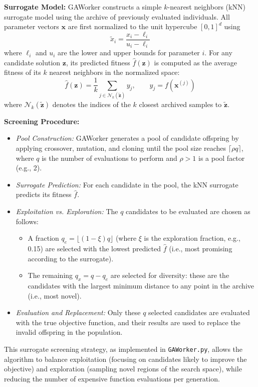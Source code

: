 \documentclass[12pt,a4paper]{article}
\begin{document}
\textbf{Surrogate Model:}  
GAWorker constructs a simple $k$-nearest neighbors (kNN) surrogate model using the archive of previously evaluated individuals. All parameter vectors $\bm{x}$ are first normalized to the unit hypercube $[0,1]^d$ using
\[
\tilde{x}_i = \frac{x_i - \ell_i}{u_i - \ell_i}
\]
where $\ell_i$ and $u_i$ are the lower and upper bounds for parameter $i$. For any candidate solution $\bm{z}$, its predicted fitness $\hat{f}(\bm{z})$ is computed as the average fitness of its $k$ nearest neighbors in the normalized space:
\[
\hat{f}(\bm{z}) = \frac{1}{k} \sum_{j \in \mathcal{N}_k(\tilde{\bm{z}})} y_j, \qquad y_j = f(\bm{x}^{(j)})
\]
where $\mathcal{N}_k(\tilde{\bm{z}})$ denotes the indices of the $k$ closest archived samples to $\tilde{\bm{z}}$.

\textbf{Screening Procedure:}
\begin{itemize}
    \item \emph{Pool Construction:} GAWorker generates a pool of candidate offspring by applying crossover, mutation, and cloning until the pool size reaches $\lceil \rho q \rceil$, where $q$ is the number of evaluations to perform and $\rho > 1$ is a pool factor (e.g., 2).
    \item \emph{Surrogate Prediction:} For each candidate in the pool, the kNN surrogate predicts its fitness $\hat{f}$.
    \item \emph{Exploitation vs. Exploration:} The $q$ candidates to be evaluated are chosen as follows:
    \begin{itemize}
        \item A fraction $q_e = \lfloor (1-\xi)q \rfloor$ (where $\xi$ is the exploration fraction, e.g., 0.15) are selected with the lowest predicted $\hat{f}$ (i.e., most promising according to the surrogate).
        \item The remaining $q_x = q - q_e$ are selected for diversity: these are the candidates with the largest minimum distance to any point in the archive (i.e., most novel).
    \end{itemize}
    \item \emph{Evaluation and Replacement:} Only these $q$ selected candidates are evaluated with the true objective function, and their results are used to replace the invalid offspring in the population.
\end{itemize}

This surrogate screening strategy, as implemented in \texttt{GAWorker.py}, allows the algorithm to balance exploitation (focusing on candidates likely to improve the objective) and exploration (sampling novel regions of the search space), while reducing the number of expensive function evaluations per generation.
\end{document}
